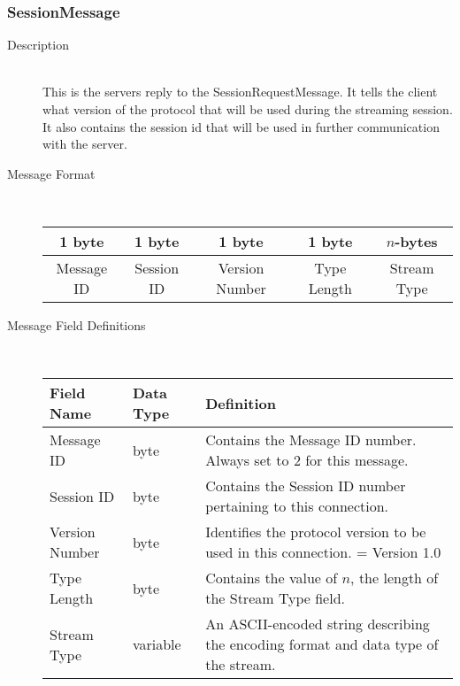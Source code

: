\documentclass[12pt,letterpaper,titlepage]{article}
\begin{document}
\subsubsection{SessionMessage}
	\begin{description}
	\item[Description] \hfill \\
		This is the servers reply to the SessionRequestMessage. It tells the client what version of 
		the protocol that will be used during the streaming session. It also contains the session id 
		that will be used in further communication with the server.
	\item[Message Format] \hfill \\
	\begin{tabular}{ | c | c | c | c | c | }
		\hline
		1 byte & 1 byte & 1 byte & 1 byte & $n$-bytes \\
		\hline
		Message ID & Session ID &  Version Number & Type Length & Stream Type \\
		\hline
	\end{tabular}
	\item[Message Field Definitions] \hfill \\
	\begin{tabular}{ | p{3cm} | p{1cm} | p{8cm} | }
		\hline
		Field Name & Data Type & Definition \\
		\hline
		Message ID & byte & Contains the Message ID number. \newline Always set to 2 for this message. \\
		\hline
		Session ID & byte & Contains the Session ID number pertaining to this connection. \\
		\hline
		Version Number & byte & Identifies the protocol version to be used in this connection.
						\newline 1 = Version 1.0 \\
		\hline
        Type Length & byte & Contains the value of $n$, the length of the Stream Type field. \\
        \hline
        Stream Type & variable & An ASCII-encoded string describing the encoding format and data type of the stream. \\
        \hline
	\end{tabular}
	\end{description}
\end{document}
